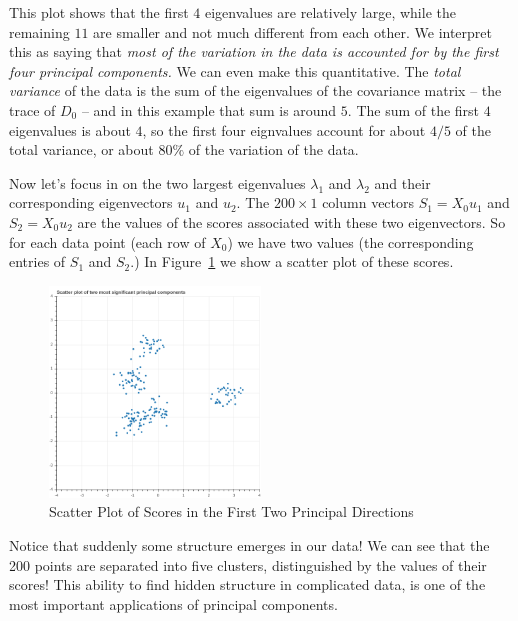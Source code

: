 \documentclass[
  11pt,
  letterpaper,
]{scrbook}
\theoremstyle{plain}
\theoremstyle{plain}
\theoremstyle{remark}
\begin{document}
This plot shows that the first \(4\) eigenvalues are relatively large,
while the remaining \(11\) are smaller and not much different from each
other. We interpret this as saying that \emph{most of the variation in
the data is accounted for by the first four principal components.} We
can even make this quantitative. The \emph{total variance} of the data
is the sum of the eigenvalues of the covariance matrix -- the trace of
\(D_{0}\) -- and in this example that sum is around \(5\). The sum of
the first \(4\) eigenvalues is about \(4\), so the first four eignvalues
account for about \(4/5\) of the total variance, or about \(80\%\) of
the variation of the data.

Now let's focus in on the two largest eigenvalues \(\lambda_{1}\) and
\(\lambda_{2}\) and their corresponding eigenvectors \(u_{1}\) and
\(u_{2}\). The \(200\times 1\) column vectors \(S_{1}=X_{0}u_{1}\) and
\(S_{2}=X_{0}u_{2}\) are the values of the scores associated with these
two eigenvectors. So for each data point (each row of \(X_{0}\)) we have
two values (the corresponding entries of \(S_{1}\) and \(S_{2}\).) In
Figure~\ref{fig-principalvalues} we show a scatter plot of these scores.

\begin{figure}

{\centering \includegraphics[width=0.5\textwidth,height=\textheight]{chapters/img/pcadimred.png}

}

\caption{\label{fig-principalvalues}Scatter Plot of Scores in the First
Two Principal Directions}

\end{figure}

Notice that suddenly some structure emerges in our data! We can see that
the 200 points are separated into five clusters, distinguished by the
values of their scores! This ability to find hidden structure in
complicated data, is one of the most important applications of principal
components.
\end{document}
